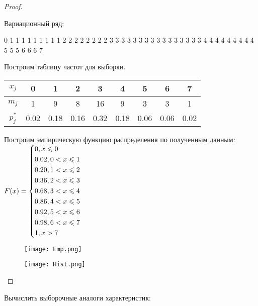 \begin{proof}
	$ $
		
	Вариационный ряд:
	
	0 1 1 1 1 1 1 1 1 1 2 2 2 2 2 2 2 2 3 3 3 3 3 3 3 3 3 3 3 3 3 3 3 3 4 4 4 4 4 4 4 4 4 5 5 5 6 6 6 7 
	
	Построим таблицу частот для выборки.
	\begin{table}[h]
    \centering	
	\begin{tabular}{|c|c|c|c|c|c|c|c|c|}
		\hline
		$x_j$&0&1&2&3&4&5&6&7\\ \hline
		$m_j$&1&9&8&16&9&3&3&1\\ \hline
		$p_j^*$&0.02&0.18&0.16&0.32&0.18&0.06&0.06&0.02\\
		\hline
	\end{tabular}
	\end{table}
	
	Построим эмпирическую функцию распределения по полученным данным:\\
	
	 $F(x)=\left\{ 
	\begin{gathered} 
		0, x \leqslant 0 \hfill \\  
		0.02, 0 < x \leqslant 1 \hfill \\
		0.20, 1 < x \leqslant 2 \hfill \\
		0.36, 2 < x \leqslant 3 \hfill \\
		0.68, 3 < x \leqslant 4 \hfill \\
		0.86, 4 < x \leqslant 5 \hfill \\
		0.92, 5 < x \leqslant 6 \hfill \\
		0.98, 6 < x \leqslant 7 \hfill \\
		1, x > 7 \hfill \\
	\end{gathered}
	\right.$	
	\begin{figure}[h]
		\texttt{[image: Emp.png]}
	\end{figure}
	\begin{figure}[h]
		\texttt{[image: Hist.png]}
	\end{figure}
\end{proof}
\newpage

\begin{problem}
	Вычислить выборочные аналоги характеристик:
\end{problem}

